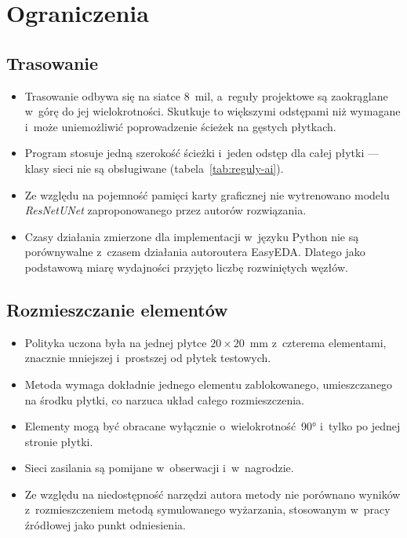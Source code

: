 \section{Ograniczenia}
\label{sec:ograniczenia}

\subsection{Trasowanie}
\label{sec:ograniczenia-trasowanie}

\begin{itemize}
  \item Trasowanie odbywa się na siatce 8~mil, a~reguły projektowe są
    zaokrąglane w~górę do jej wielokrotności. Skutkuje to większymi
    odstępami niż wymagane i~może uniemożliwić poprowadzenie ścieżek
    na gęstych płytkach.
  \item Program stosuje jedną szerokość ścieżki i~jeden odstęp dla całej
    płytki --- klasy sieci nie są obsługiwane (tabela~\ref{tab:reguly-ai}).
  \item Ze względu na pojemność pamięci karty graficznej nie wytrenowano
    modelu \emph{ResNetUNet} zaproponowanego przez autorów rozwiązania.
  \item Czasy działania zmierzone dla implementacji w~języku Python nie są
    porównywalne z~czasem działania autoroutera EasyEDA. Dlatego jako
    podstawową miarę wydajności przyjęto liczbę rozwiniętych węzłów.
\end{itemize}

\subsection{Rozmieszczanie elementów}
\label{sec:ograniczenia-rozmieszczanie}

\begin{itemize}
  \item Polityka uczona była na jednej płytce $20 \times 20$~mm
    z~czterema elementami, znacznie mniejszej i~prostszej od płytek
    testowych.
  \item Metoda wymaga dokładnie jednego elementu zablokowanego,
    umieszczanego na środku płytki, co narzuca układ całego
    rozmieszczenia.
  \item Elementy mogą być obracane wyłącznie o~wielokrotność~90° i~tylko
    po jednej stronie płytki.
  \item Sieci zasilania są pomijane w~obserwacji i~w~nagrodzie.
  \item Ze względu na niedostępność narzędzi autora metody nie porównano
    wyników z~rozmieszczeniem metodą symulowanego wyżarzania, stosowanym
    w~pracy źródłowej jako punkt odniesienia.
\end{itemize}
